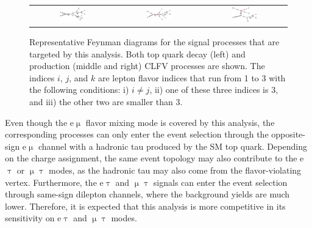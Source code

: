  \begin{figure}[tbh!]
 \begin{center}
 \begin{tabular}{ccc}
 \includegraphics[width=0.33\textwidth]{figures/Part4/Signal/TT}&
 \includegraphics[width=0.33\textwidth]{figures/Part4/Signal/ST1}&
 \includegraphics[width=0.33\textwidth]{figures/Part4/Signal/ST2}\\
 \end{tabular}
 \caption{Representative Feynman diagrams for the signal processes that are targeted by this analysis. Both top quark decay (left) and production (middle and right) \ac{CLFV} processes are shown. The indices $i$,  $j$, and $k$ are lepton flavor indices that run from 1 to 3 with the following conditions: i) $i\neq j$, ii) one of these three indices is 3, and iii) the other two are smaller than 3.}
 \label{fig:Target}
 \end{center}
 \end{figure}

Even though the e$\upmu$ flavor mixing mode is covered by this analysis, the corresponding processes can only enter the event selection through the opposite-sign e$\upmu$ channel with a hadronic tau produced by the \ac{SM} top quark. Depending on the charge assignment, the same event topology may also contribute to the e$\uptau$ or $\upmu\uptau$ modes, as the hadronic tau may also come from the flavor-violating vertex. Furthermore, the e$\uptau$ and $\upmu\uptau$ signals can enter the event selection through same-sign dilepton channels, where the background yields are much lower. Therefore, it is expected that this analysis is more competitive in its sensitivity on e$\uptau$ and $\upmu\uptau$ modes.
